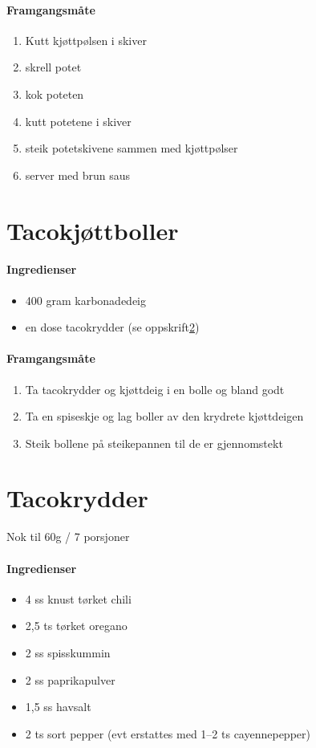 \documentclass[12pt,a4paper]{book}
\begin{document}
\paragraph{Framgangsmåte}
\begin{enumerate}[noitemsep]
	\item Kutt kjøttpølsen i skiver
	\item skrell potet
	\item kok poteten
	\item kutt potetene i skiver
	\item steik potetskivene sammen med kjøttpølser
	\item server med brun saus
\end{enumerate}
\clearpage{}
\clearpage{}\section{﻿Tacokjøttboller}

\paragraph{Ingredienser}
\begin{itemize}[noitemsep]
	\item 400 gram karbonadedeig
	\item en dose tacokrydder (se oppskrift\ref{tacokrydder})
\end{itemize}

\paragraph{Framgangsmåte}
\begin{enumerate}[noitemsep]
	\item Ta tacokrydder og kjøttdeig i en bolle og bland godt
	\item Ta en spiseskje og lag boller av den krydrete kjøttdeigen
	\item Steik bollene på steikepannen til de er gjennomstekt
\end{enumerate}
\clearpage{}
\clearpage{}\section{﻿Tacokrydder}
\label{tacokrydder}

Nok til 60g / 7 porsjoner
\paragraph{Ingredienser}
\begin{itemize}[noitemsep]
	\item 4 ss knust tørket chili
	\item 2,5 ts tørket oregano
	\item 2 ss spisskummin
	\item 2 ss paprikapulver
	\item 1,5 ss havsalt
	\item 2 ts sort pepper (evt erstattes med 1--2 ts cayennepepper)
\end{itemize}
\end{document}
